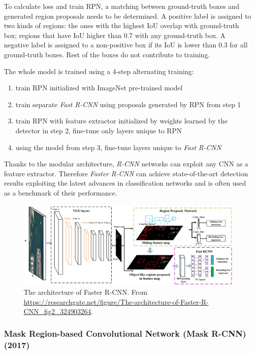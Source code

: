  To calculate loss and train RPN, a matching between ground-truth boxes and generated region proposals needs to be determined. A positive label is assigned to two kinds of regions: the ones with the highest IoU overlap with ground-truth box; regions that have IoU higher than 0.7 with any ground-truth box. A negative label is assigned to a non-positive box if its IoU is lower than 0.3 for all ground-truth boxes. Rest of the boxes do not contribute to training. 
 
 The whole model is trained using a 4-step alternating training:
 
 \begin{enumerate}
     \item train RPN initialized with ImageNet pre-trained model
     \item train separate \textit{Fast R-CNN} using proposals generated by RPN from step 1
     \item train RPN with feature extractor initialized by weights learned by the detector in step 2, fine-tune only layers unique to RPN
     \item using the model from step 3, fine-tune layers unique to \textit{Fast R-CNN}
 \end{enumerate}

Thanks to the modular architecture, \textit{R-CNN} networks can exploit any CNN as a feature extractor.  Therefore \textit{Faster R-CNN} can achieve state-of-the-art detection results exploiting the latest advances in classification networks and is often used as a benchmark of their performance.
     

 \begin{figure}
     \centering
     \includegraphics[width=\textwidth]{img/fasterrcnn}
     \caption{The architecture of Faster R-CNN. From \url{https://researchgate.net/figure/The-architecture-of-Faster-R-CNN\_fig2\_324903264}.}
     \label{fig:fasterrcnn}
 \end{figure}

\subsubsection{Mask Region-based Convolutional Network (Mask R-CNN) (2017)}
\cite{bib:maskrcnn}




